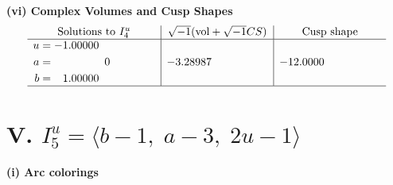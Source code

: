 \documentclass[1p]{elsarticle_modified}
\theoremstyle{definition}
\newcommand{\I}{\sqrt{-1}}
\begin{document}
\newpage\flushleft \textbf{(vi) Complex Volumes and Cusp Shapes}
$$\begin{array}{c|c|c}  
\text{Solutions to }I^u_{4}& \I (\text{vol} + \sqrt{-1}CS) & \text{Cusp shape}\\
 \hline 
\begin{aligned}
u &= -1.00000\phantom{ +0.000000I} \\
a &= \phantom{-0.000000 } 0 \\
b &= \phantom{-}1.00000\phantom{ +0.000000I}\end{aligned}
 & -3.28987\phantom{ +0.000000I} & -12.0000\phantom{ +0.000000I}\\
 \hline 
 \end{array}$$\newpage\newpage\renewcommand{\arraystretch}{1}
\centering \section*{V. $I^u_{5}= \langle b-1,\;a-3,\;2 u-1 \rangle$}
\flushleft \textbf{(i) Arc colorings}\\
\end{document}
